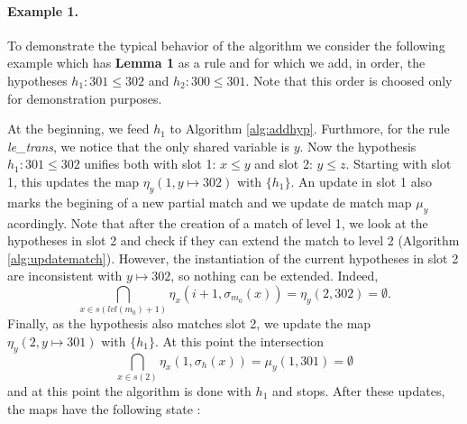 \documentclass[runningheads]{llncs}
\newcommand{\xcom}[1]{{\color{cyan}{Xavier: #1}} }
\begin{document}
\paragraph{Example 1.}

\xcom{Technically, it is useless to save level 1 hyps in $\eta_x$. Should we remove them from the examples?.}
To demonstrate the typical behavior of the algorithm we consider the following example which has \textbf{Lemma 1} as a rule and for which we add, in order, the hypotheses $h_1 : 301 \leq 302$ and $h_2 : 300 \leq 301$.
Note that this order is choosed only for demonstration purposes.

At the beginning, we feed $h_1$ to Algorithm \ref{alg:addhyp}.
Furthmore, for the rule \textit{le\_trans}, we notice that the only shared variable is ${y}$.
Now the hypothesis $h_1 : 301 \leq 302$ unifies both with slot 1: $x \leq y$ and slot 2: $y \leq z$.
Starting with slot 1, this updates the map $\eta_y(1, y \mapsto 302)$ with $\{h_1\}$.
An update in slot 1 also marks the begining of a new partial match and we update de match map $\mu_y$ acordingly.
Note that after the creation of a match of level 1, we look at the hypotheses in slot 2 and check if they can extend the match to level 2 (Algorithm \ref{alg:updatematch}). However, the instantiation of the current hypotheses in slot 2 are inconsistent with $y \mapsto 302$, so nothing can be extended. Indeed, 
\[
  \bigcap_{x\in s(lvl(m_0) + 1)} \eta_x \left(i + 1, \sigma_{m_0}(x)\right) = \eta_y(2, 302) = \emptyset.
\]
Finally, as the hypothesis also matches slot 2, we update the map $\eta_y(2, y \mapsto 301)$ with $\{h_1\}$.
At this point the intersection
\[
  \bigcap_{x\in s(2)} \eta_x \left(1, \sigma_{h}(x)\right) = \mu_y(1, 301) = \emptyset
\]
and at this point the algorithm is done with $h_1$ and stops.
After these updates, the maps have the following state :

\begin{center}
\end{center}
\end{document}
